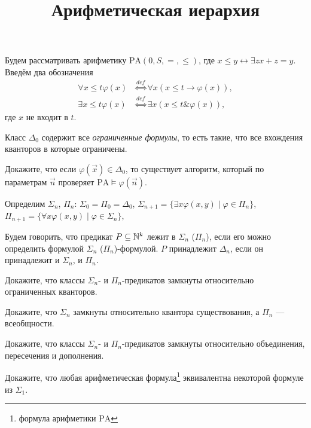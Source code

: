\documentclass[a4paper, 12pt, num=Г2]{listok}
\renewcommand{\phi}{\varphi}
\begin{document}
\title{Арифметическая иерархия}
\maketitle
Будем рассматривать арифметику $\mathrm{PA}(0, S, =, \le)$,
где $x \le y \leftrightarrow \exists z x + z = y$.
Введём два обозначения
\begin{align*}
	\forall{x \le t}\phi(x) & \stackrel{def}{\Leftrightarrow} \forall x (x \le t \to \phi(x)), \\
	\exists{x \le t}\phi(x) & \stackrel{def}{\Leftrightarrow} \exists x (x \le t \&  \phi(x)),
\end{align*}
где $x$ не входит в $t$.
\begin{definition}
	Класс $\Delta_0$ содержит все \textit{ограниченные формулы},
	то есть такие, что все вхождения кванторов в которые ограничены.
\end{definition}
\begin{problem}
	Докажите, что если $\phi(\vec x) \in \Delta_0$, то существует алгоритм,
	который по параметрам $\vec n$ проверяет $\mathrm{PA} \models \phi(\vec n)$.
\end{problem}
\begin{definition}
	Определим $\Sigma_n$, $\Pi_n$:
	$\Sigma_0 = \Pi_0 = \Delta_0$,
	$\Sigma_{n + 1} = \{ \exists x \phi(x, y) \mid \phi \in \Pi_n \}$,
	$\Pi_{n + 1} = \{ \forall x \phi(x, y) \mid \phi \in \Sigma_n \}$,
\end{definition}
\begin{definition}
	Будем говорить, что предикат $P \subseteq \mathbb{N}^k$ лежит в $\Sigma_n$ ($\Pi_n$),
	если его можно определить формулой $\Sigma_n$ ($\Pi_n$)-формулой.
	$P$ принадлежит $\Delta_n$, если он принадлежит и $\Sigma_n$, и $\Pi_n$.
\end{definition}
\begin{problem}
	Докажите, что классы $\Sigma_n$- и $\Pi_n$-предикатов замкнуты относительно ограниченных кванторов.
\end{problem}
\begin{problem}
	Докажите, что $\Sigma_n$ замкнуты относительно квантора существования, а $\Pi_n$ --- всеобщности.
\end{problem}
\begin{problem}
	Докажите, что классы $\Sigma_n$- и $\Pi_n$-предикатов замкнуты относительно объединения, пересечения и дополнения.
\end{problem}
\begin{problem}
	Докажите, что любая арифметическая формула\footnote{формула арифметики $\mathrm{PA}$} эквивалентна некоторой формуле из $\Sigma_1$.
\end{problem}
\end{document}
